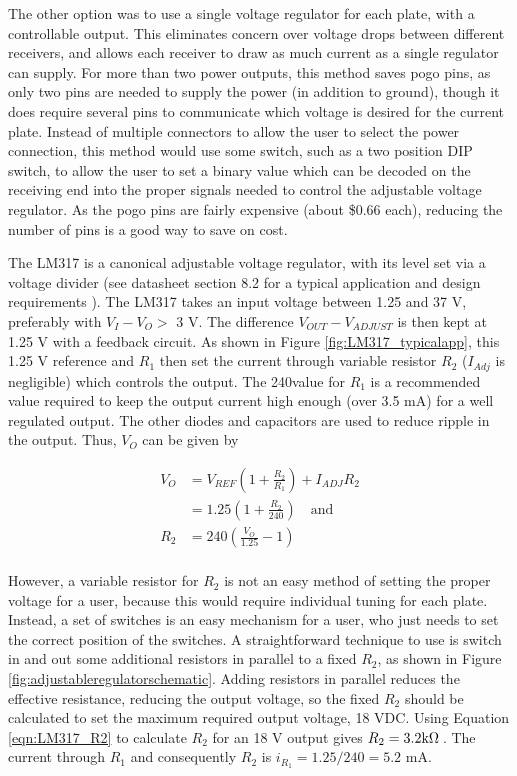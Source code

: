 		The other option was to use a single voltage regulator for each plate, with a controllable output.  This eliminates concern over voltage drops between different receivers, and allows each receiver to draw as much current as a single regulator can supply.  For more than two power outputs, this method saves pogo pins, as only two pins are needed to supply the power (in addition to ground), though it does require several pins to communicate which voltage is desired for the current plate.  Instead of multiple connectors to allow the user to select the power connection, this method would use some switch, such as a two position DIP switch, to allow the user to set a binary value which can be decoded on the receiving end into the proper signals needed to control the adjustable voltage regulator.  As the pogo pins are fairly expensive (about \$0.66 each), reducing the number of pins is a good way to save on cost.

		The LM317 is a canonical adjustable voltage regulator, with its level set via a voltage divider (see datasheet section 8.2 for a typical application and design requirements \cite{LM317datasheet}).  The LM317 takes an input voltage between 1.25 and 37 V, preferably with $V_I - V_O > $ 3 V.  The difference $V_{OUT} - V_{ADJUST}$ is then kept at 1.25 V with a feedback circuit.  As shown in Figure \ref{fig:LM317_typicalapp}, this 1.25 V reference and $R_1$ then set the current through variable resistor $R_2$ ($I_{Adj}$ is negligible) which controls the output.  The 240\ohm value for $R_1$ is a recommended value required to keep the output current high enough (over 3.5 mA) for a well regulated output.  The other diodes and capacitors are used to reduce ripple in the output.  Thus, $V_O$ can be given by

		\begin{align}
			V_O &= V_{REF}(1 + \frac{R_2}{R_1}) + I_{ADJ}R_2 \\
			&= 1.25 (1 + \frac{R_2}{240}) \quad \text{and} \\
			R_2 &= 240 \left( \frac{V_O}{1.25} - 1 \right) \\
			\label{eqn:LM317_R2}
		\end{align}

		However, a variable resistor for $R_2$ is not an easy method of setting the proper voltage for a user, because this would require individual tuning for each plate.  Instead, a set of switches is an easy mechanism for a user, who just needs to set the correct position of the switches.  A straightforward technique to use is switch in and out some additional resistors in parallel to a fixed $R_2$, as shown in Figure \ref{fig:adjustableregulatorschematic}.  Adding resistors in parallel reduces the effective resistance, reducing the output voltage, so the fixed $R_2$ should be calculated to set the maximum required output voltage, 18 VDC.  Using Equation \ref{eqn:LM317_R2} to calculate $R_2$ for an 18 V output gives $R_2 = 3.2 \text{k$\Omega$\:}$. The current through $R_1$ and consequently $R_2$ is $i_{R_1} = 1.25/240 = 5.2$ mA.  


